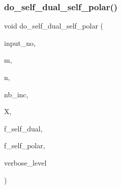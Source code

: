 \mbox{\label{action__global_8_c_a273755ca3e27270f03e9b7beaa6bb72b}} 
\subsubsection{\texorpdfstring{do\+\_\+self\+\_\+dual\+\_\+self\+\_\+polar()}{do\_self\_dual\_self\_polar()}}
{\footnotesize\ttfamily void do\+\_\+self\+\_\+dual\+\_\+self\+\_\+polar (\begin{DoxyParamCaption}\item[{\mbox{\hyperlink{galois_8h_a09fddde158a3a20bd2dcadb609de11dc}{I\+NT}}}]{input\+\_\+no,  }\item[{\mbox{\hyperlink{galois_8h_a09fddde158a3a20bd2dcadb609de11dc}{I\+NT}}}]{m,  }\item[{\mbox{\hyperlink{galois_8h_a09fddde158a3a20bd2dcadb609de11dc}{I\+NT}}}]{n,  }\item[{\mbox{\hyperlink{galois_8h_a09fddde158a3a20bd2dcadb609de11dc}{I\+NT}}}]{nb\+\_\+inc,  }\item[{\mbox{\hyperlink{galois_8h_a09fddde158a3a20bd2dcadb609de11dc}{I\+NT}} $\ast$}]{X,  }\item[{\mbox{\hyperlink{galois_8h_a09fddde158a3a20bd2dcadb609de11dc}{I\+NT}} \&}]{f\+\_\+self\+\_\+dual,  }\item[{\mbox{\hyperlink{galois_8h_a09fddde158a3a20bd2dcadb609de11dc}{I\+NT}} \&}]{f\+\_\+self\+\_\+polar,  }\item[{\mbox{\hyperlink{galois_8h_a09fddde158a3a20bd2dcadb609de11dc}{I\+NT}}}]{verbose\+\_\+level }\end{DoxyParamCaption})}

\mbox{\label{action__global_8_c_aaa17f24fdab7065fbb11a06c513a4562}} 
